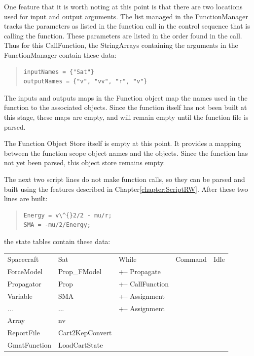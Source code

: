One feature that it is worth noting at this point is that there are two locations used for input and
output arguments.  The list managed in the FunctionManager tracks the parameters as listed in the
function call in the control sequence that is calling the function.  These parameters are listed in
the order found in the call.  Thus for this CallFunction, the StringArrays containing the arguments
in the FunctionManager contain these data:

\begin{quote}
\begin{verbatim}
inputNames = {"Sat"}
outputNames = {"v", "vv", "r", "v"}
\end{verbatim}
\end{quote}

The inputs and outputs maps in the Function object map the names used in the function to the
associated objects.  Since the function itself has not been built at this stage, these maps are
empty, and will remain empty until the function file is parsed.

The Function Object Store itself is empty at this point.  It provides a mapping between the function
scope object names and the objects.  Since the function has not yet been parsed, this object store
remains empty.

The next two script lines do not make function calls, so they can be parsed and built using the
features described in Chapter\ref{chapter:ScriptRW}.  After these two lines are built:

\begin{quote}
\begin{verbatim}
Energy = v\^{}2/2 - mu/r;
SMA = -mu/2/Energy;
\end{verbatim}
\end{quote}

\noindent the state tables contain these data:

\begin{center}
\tablelasttail{\hline}
\begin{supertabular}{|l l|l|l|l|}
Spacecraft & Sat & While & Command & Idle\\
ForceModel & Prop\_FModel & +-- Propagate & & \\
Propagator & Prop & +-- CallFunction & & \\
Variable & SMA & +-- Assignment & & \\
... & ... & +-- Assignment & & \\
Array & nv & & & \\
ReportFile & Cart2KepConvert & & & \\
GmatFunction & LoadCartState & & & \\
\end{supertabular}
\end{center}

